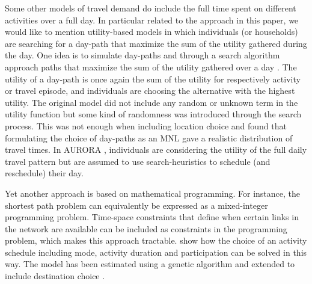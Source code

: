 Some other models of travel demand do include the full time spent on different activities over a full day. In particular related to the approach in this paper, we would like to mention utility-based models in which individuals (or households) are searching for a day-path that maximize the sum of the utility gathered during the day. One idea is to simulate day-paths and through a search algorithm approach paths that maximize the sum of the utility gathered over a day \citep{balmer05}. The utility of a day-path is once again the sum of the utility for respectively activity or travel episode, and individuals are choosing the alternative with the highest utility. The original model did not include any random or unknown term in the utility function but some kind of randomness was introduced through the search process. This was not enough when including location choice and \citet{horni2011} found that formulating the choice of day-paths as an MNL gave a realistic distribution of travel times. In AURORA \citep{joh2003Aurora,johEstimationAurora2005}, individuals are considering the utility of the full daily travel pattern but are assumed to use search-heuristics to schedule (and reschedule) their day. 


Yet another approach is based on mathematical programming. For instance, the shortest path problem can equivalently be expressed as a mixed-integer programming problem. Time-space constraints that define when certain links in the network are available can be included as constraints in the programming problem, which makes this approach tractable. \citet{Recker01} show how the choice of an activity schedule including mode, activity duration and participation can be solved in this way. The model has been estimated using a genetic algorithm \citep{Recker08} and extended to include destination choice \citep{Recker13}.


